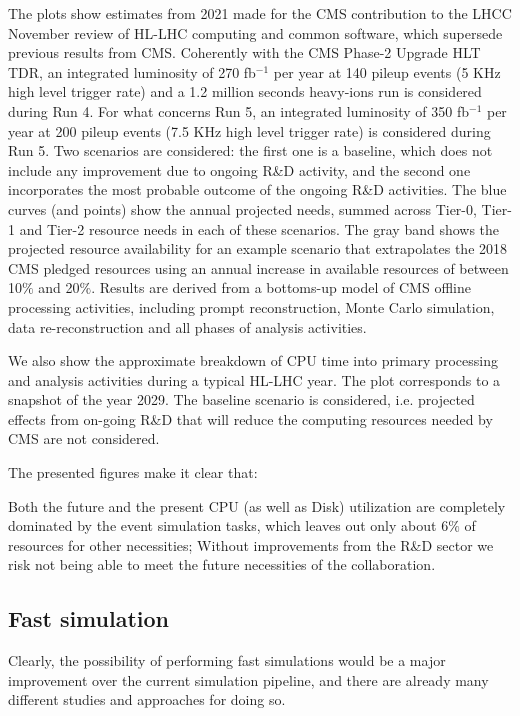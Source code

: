 The plots show estimates from 2021 made for the CMS contribution to the LHCC November review of HL-LHC computing and common software, which supersede previous results from CMS. Coherently with the CMS Phase-2 Upgrade HLT TDR, an integrated luminosity of 270 fb$^{-1}$ per year at 140 pileup events (5 KHz high level trigger rate) and a 1.2 million seconds heavy-ions run is considered during Run 4. For what concerns Run 5, an integrated luminosity of 350 fb$^{-1}$ per year at 200 pileup events (7.5 KHz high level trigger rate) is considered during Run 5. Two scenarios are considered: the first one is a baseline, which does not include any improvement due to ongoing R\&D activity, and the second one incorporates the most probable outcome of the ongoing R\&D activities. The blue curves (and points) show the annual projected needs, summed across Tier-0, Tier-1 and Tier-2 resource needs in each of these scenarios. The gray band shows the projected resource availability for an example scenario that extrapolates the 2018 CMS pledged resources using an annual increase in available resources of between 10$\%$ and 20$\%$. Results are derived from a bottoms-up model of CMS offline processing activities, including prompt reconstruction, Monte Carlo simulation, data re-reconstruction and all phases of analysis activities. 

We also show the approximate breakdown of CPU time into primary processing and analysis activities during a typical HL-LHC year. The plot corresponds to a snapshot of the year 2029. The baseline scenario is considered, i.e. projected effects from on-going R\&D that will reduce the computing resources needed by CMS are not considered.

The presented figures make it clear that:

\begin{outline}
    \1 Both the future and the present CPU (as well as Disk) utilization are completely dominated by the event simulation tasks, which leaves out only about 6$\%$ of resources for other necessities;
    \1 Without improvements from the R\&D sector we risk not being able to meet the future necessities of the collaboration.
\end{outline}


\subsection{Fast simulation}

Clearly, the possibility of performing fast simulations would be a major improvement over the current simulation pipeline, and there are already many different studies and approaches for doing so.

